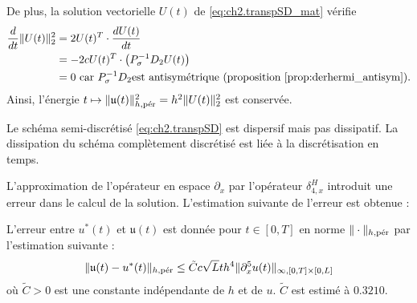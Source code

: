 De plus, la solution vectorielle $U(t)$ de \eqref{eq:ch2.transpSD_mat} vérifie
\begin{align*}
\dfrac{d}{dt} \| U(t) \|_2^2 & = 2 U(t)^T \cdot \dfrac{d U(t)}{dt} \\
	& = - 2 c U(t)^T \cdot \left( P_{\sigma}^{-1}D_2 U(t) \right) \\
	& = 0 \text{ car } P_{\sigma}^{-1}D_2 \text{est antisymétrique (proposition \ref{prop:derhermi_antisym})}.
\end{align*}
Ainsi, l'énergie $t \mapsto \| \mathfrak{u}(t) \|_{h,\per}^2 = h^2 \| U(t) \|_2^2$ est conservée.

Le schéma semi-discrétisé \eqref{eq:ch2.transpSD} est dispersif mais pas dissipatif. La dissipation du schéma complètement discrétisé est liée à la discrétisation en temps.

L'approximation de l'opérateur en espace $\partial_x$ par l'opérateur $\delta_{4,x}^H$ introduit une erreur dans le calcul de la solution. L'estimation suivante de l'erreur est obtenue :
\begin{proposition}
L'erreur entre $u^*(t)$ et $\mathfrak{u}(t)$ est donnée pour $t \in [0,T]$ en norme $\| \cdot \|_{h,\per}$ par l'estimation suivante :
\begin{equation}
\| \mathfrak{u}(t) - u^*(t) \|_{h,\per} \leq \tilde{C} c \sqrt{L} t h^4 \| \partial^5_x u(t) \|_{\infty,[0,T] \times [0,L]}
\end{equation}
où $\tilde{C}>0$ est une constante indépendante de $h$ et de $u$. $\tilde{C}$ est estimé à $0.3210$.
\label{prop:consistance_h_trsp}
\end{proposition}

